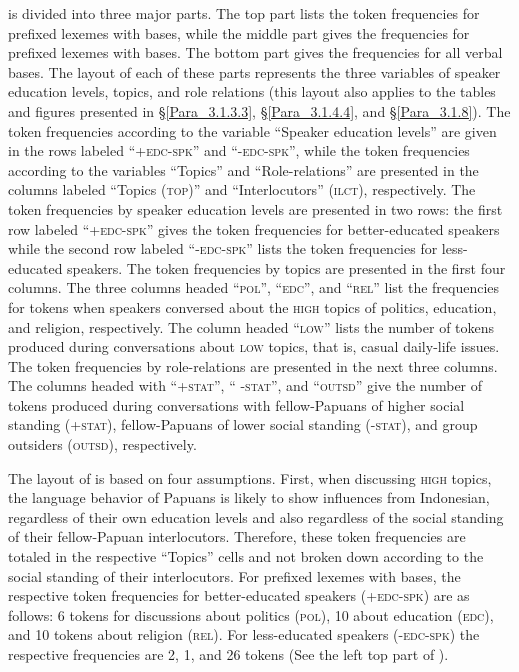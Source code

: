  is divided into three major parts. The top part lists the token frequencies for prefixed lexemes with  bases, while the middle part gives the frequencies for prefixed lexemes with  bases. The bottom part gives the frequencies for all verbal bases. The layout of each of these parts represents the three variables of speaker education levels, topics, and role relations (this layout also applies to the tables and figures presented in §\ref{Para_3.1.3.3}, §\ref{Para_3.1.4.4}, and §\ref{Para_3.1.8}). The token frequencies according to the variable ``Speaker education levels'' are given in the rows labeled ``\textsc{+edc-spk}'' and ``\textsc{-edc-spk}'', while the token frequencies according to the variables ``Topics'' and ``Role-relations'' are presented in the columns labeled ``Topics (\textsc{top})'' and ``Interlocutors'' (\textsc{ilct}), respectively. The token frequencies by speaker education levels are presented in two rows: the first row labeled ``\textsc{+edc-spk}'' gives the token frequencies for better-educated speakers while the second row labeled ``\textsc{-edc-spk}'' lists the token frequencies for less-educated speakers. The token frequencies by topics are presented in the first four columns. The three columns headed ``\textsc{pol}'', ``\textsc{edc}'', and ``\textsc{rel}'' list the frequencies for tokens when speakers conversed about the \textsc{high} topics of politics, education, and religion, respectively. The column headed ``\textsc{low}'' lists the number of tokens produced during conversations about \textsc{low} topics, that is, casual daily-life issues. The token frequencies by role-relations are presented in the next three columns. The columns headed with ``\textsc{+stat}'', ``\textsc{ -stat}'', and ``\textsc{outsd}'' give the number of tokens produced during conversations with fellow-Papuans of higher social standing (\textsc{+stat}), fellow-Papuans of lower social standing (\textsc{-stat}), and group outsiders (\textsc{outsd}), respectively.


The layout of  is based on four assumptions. First, when discussing \textsc{high} topics, the language behavior of Papuans is likely to show influences from Indonesian, regardless of their own education levels and also regardless of the social standing of their fellow-Papuan interlocutors. Therefore, these token frequencies are totaled in the respective ``Topics'' cells and not broken down according to the social standing of their interlocutors. For prefixed lexemes with  bases, the respective token frequencies for better-educated speakers (\textsc{+edc-spk}) are as follows: 6 tokens for discussions about politics (\textsc{pol}), 10 about education (\textsc{edc}), and 10 tokens about religion (\textsc{rel}). For less-educated speakers (\textsc{-edc-spk}) the respective frequencies are 2, 1, and 26 tokens (See the left top part of ).



